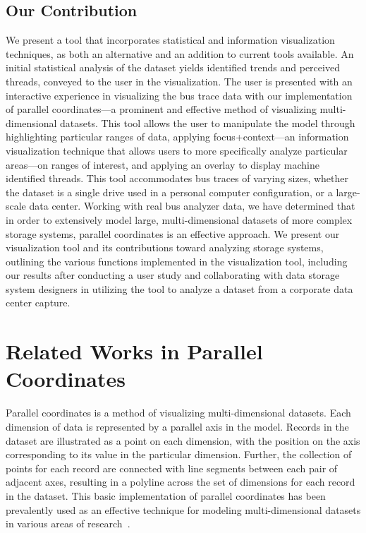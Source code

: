 \documentclass[journal]{vgtc}                %
\begin{document}
\subsection{Our Contribution}
\label{contribution}

We present a tool that incorporates statistical and information visualization techniques, as both an alternative and an addition to current tools available.  An initial statistical analysis of the dataset yields identified trends and perceived threads, conveyed to the user in the visualization. The user is presented with an interactive experience in visualizing the bus trace data with our implementation of parallel coordinates---a prominent and effective method of visualizing multi-dimensional datasets. This tool allows the user to manipulate the model through highlighting particular ranges of data,  applying focus+context---an information visualization technique that allows users to more specifically analyze particular areas---on ranges of interest, and applying an overlay to display machine identified threads. This tool accommodates bus traces of varying sizes, whether the dataset is a single drive used in a personal computer configuration, or a large-scale data center. Working with real bus analyzer data, we have determined that in order to extensively model large, multi-dimensional datasets of more complex storage systems, parallel coordinates is an effective approach. We present our visualization tool and its contributions toward analyzing storage systems, outlining the various functions implemented in the visualization tool, including our results after conducting a user study and collaborating with data storage system designers in utilizing the tool to analyze a dataset from a corporate data center capture.

\section{Related Works in Parallel Coordinates}
\label{related-works}

Parallel coordinates is a method of visualizing multi-dimensional datasets. Each dimension of data is represented by a parallel axis in the model. Records in the dataset are illustrated as a point on each dimension, with the position on the axis corresponding to its value in the particular dimension. Further, the collection of points for each record are connected with line segments between each pair of adjacent axes, resulting in a polyline across the set of dimensions for each record in the dataset. This basic implementation of parallel coordinates has been prevalently used as an effective technique for modeling multi-dimensional datasets in various areas of research~\cite{Inselberg:1990:PCT:949531.949588}.
\end{document}

